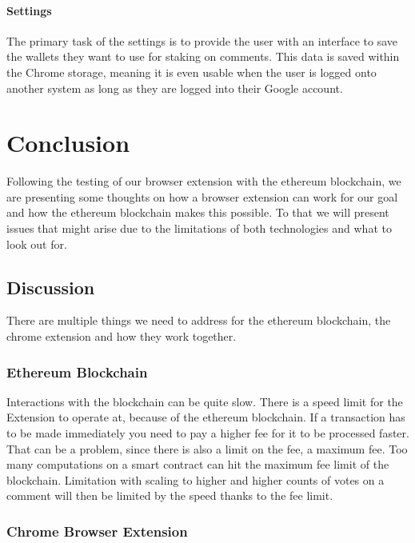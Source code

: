 \documentclass[sigconf]{acmart}
\begin{document}
\paragraph{Settings}

The primary task of the settings is to provide the user with an interface to save the wallets they want to use for staking on comments. This data is saved within the Chrome storage, meaning it is even usable when the user is logged onto another system as long as they are logged into their Google account.


\section{Conclusion}

Following the testing of our browser extension with the ethereum blockchain, we are presenting some thoughts on how a browser extension can work for our goal and how the ethereum blockchain makes this possible. To that we will present issues that might arise due to the limitations of both technologies and what to look out for.

\subsection{Discussion}

There are multiple things we need to address for the ethereum blockchain, the chrome extension and how they work together.

\subsubsection{Ethereum Blockchain}

Interactions with the blockchain can be quite slow. There is a speed limit for the Extension to operate at, because of the ethereum blockchain. If a transaction has to be made immediately you need to pay a higher fee for it to be processed faster. That can be a problem, since there is also a limit on the fee, a maximum fee. Too many computations on a smart contract can hit the maximum fee limit of the blockchain.
Limitation with scaling to higher and higher counts of votes on a comment will then be limited by the speed thanks to the fee limit.


\subsubsection{Chrome Browser Extension}
\end{document}
